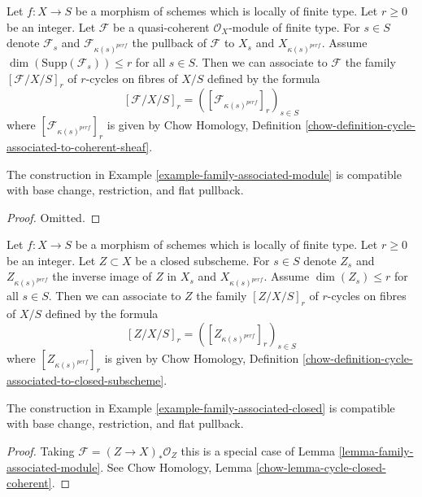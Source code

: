 \begin{example}
\label{example-family-associated-module}
Let $f : X \to S$ be a morphism of schemes which is locally of finite type.
Let $r \geq 0$ be an integer. Let $\mathcal{F}$ be a quasi-coherent
$\mathcal{O}_X$-module of finite type. For $s \in S$ denote $\mathcal{F}_s$
and $\mathcal{F}_{\kappa(s)^{perf}}$
the pullback of $\mathcal{F}$ to $X_s$ and $X_{\kappa(s)^{perf}}$.
Assume $\dim(\text{Supp}(\mathcal{F}_s)) \leq r$ for all $s \in S$.
Then we can associate to $\mathcal{F}$ the family $[\mathcal{F}/X/S]_r$ of
$r$-cycles on fibres of $X/S$ defined by the formula
$$
[\mathcal{F}/X/S]_r = ([\mathcal{F}_{\kappa(s)^{perf}}]_r)_{s \in S}
$$
where $[\mathcal{F}_{\kappa(s)^{perf}}]_r$ is given by
Chow Homology, Definition
\ref{chow-definition-cycle-associated-to-coherent-sheaf}.
\end{example}

\begin{lemma}
\label{lemma-family-associated-module}
The construction in Example \ref{example-family-associated-module}
is compatible with base change, restriction,
and flat pullback.
\end{lemma}

\begin{proof}
Omitted.
\end{proof}

\begin{example}
\label{example-family-associated-closed}
Let $f : X \to S$ be a morphism of schemes which is locally of finite type.
Let $r \geq 0$ be an integer. Let $Z \subset X$ be a closed subscheme.
For $s \in S$ denote $Z_s$ and $Z_{\kappa(s)^{perf}}$
the inverse image of $Z$ in $X_s$ and $X_{\kappa(s)^{perf}}$.
Assume $\dim(Z_s) \leq r$ for all $s \in S$.
Then we can associate to $Z$ the family $[Z/X/S]_r$
of $r$-cycles on fibres of $X/S$ defined by the formula
$$
[Z/X/S]_r = ([Z_{\kappa(s)^{perf}}]_r)_{s \in S}
$$
where $[Z_{\kappa(s)^{perf}}]_r$ is given by
Chow Homology, Definition
\ref{chow-definition-cycle-associated-to-closed-subscheme}.
\end{example}

\begin{lemma}
\label{lemma-family-associated-closed}
The construction in Example \ref{example-family-associated-closed}
is compatible with base change, restriction,
and flat pullback.
\end{lemma}

\begin{proof}
Taking $\mathcal{F} = (Z \to X)_*\mathcal{O}_Z$ this is a special case of
Lemma \ref{lemma-family-associated-module}. See
Chow Homology, Lemma \ref{chow-lemma-cycle-closed-coherent}.
\end{proof}

